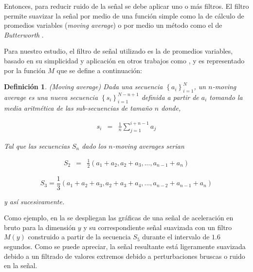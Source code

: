 Entonces, para reducir ruido de la señal se debe aplicar uno o más
filtros. El filtro permite suavizar la señal por medio de una función
simple como la de cálculo de promedios variables (\emph{moving average})
o por medio un método como el de \emph{Butterworth} \cite{ReyesOrtiz2015}. 

Para nuestro estudio, el filtro de señal utilizado es la de promedios
variables, basado en su simplicidad y aplicación en otros trabajos
como \cite{Yang2009}, y es representado por la función $M$ que se
define a continuación:

\label{def4:moving-average}\newtheorem{defi}{Definición}

\begin{defi}(\emph{Moving average}) Dada una secuencia $\left\{ a_{i}\right\} _{i=1}^{N}$,
un $n$-\emph{moving average} es una nueva secuencia $\left\{ s_{i}\right\} _{i=1}^{N-n+1}$
definida a partir de $a_{i}$ tomando la media aritmética de las \emph{sub}-secuencias
de tamaño $n$ donde,

\begin{eqnarray}
s_{i} & = & \frac{1}{n}\sum_{j=1}^{i+n-1}a_{j}
\end{eqnarray}

Tal que las secuencias $S_{n}$ dado los $n$-\emph{moving averages}
serian 

\begin{eqnarray}
S_{2} & = & \frac{1}{2}(a_{1}+a_{2},a_{2}+a_{3},...,a_{n-1}+a_{n})
\end{eqnarray}

\begin{equation}
S_{3}=\frac{1}{3}(a_{1}+a_{2}+a_{3},a_{2}+a_{3}+a_{4},...,a_{n-2}+a_{n-1}+a_{n})
\end{equation}

y así sucesivamente.\end{defi}

Como ejemplo, en la  se despliegan las gráficas
de una señal de aceleración en bruto para la dimensión $y$ y su correspondiente
señal suavizada con un filtro $M(y)$ construido a partir de la secuencia
$S_{5}$ durante el intervalo de $1.6$ segundos. Como se puede apreciar,
la señal resultante está ligeramente suavizada debido a un filtrado
de valores extremos debido a perturbaciones bruscas o ruido en la
señal.

